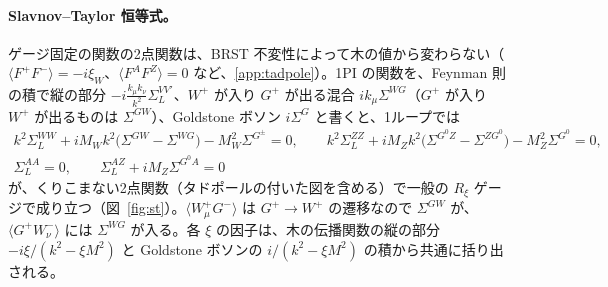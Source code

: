 \documentclass[a4paper,10pt]{ltjsarticle}
\begin{document}
\paragraph{Slavnov--Taylor 恒等式。}ゲージ固定の関数の2点関数は、BRST 不変性によって木の値から変わらない（$\langle F^+F^-\rangle=-i\xi_W$、$\langle F^AF^Z\rangle=0$ など、\ref{app:tadpole}）。1PI の関数を、Feynman 則の積で縦の部分 $-i\frac{k_\mu k_\nu}{k^2}\Sigma^{VV'}_L$、$W^+$ が入り $G^+$ が出る混合 $ik_\mu\Sigma^{WG}$（$G^+$ が入り $W^+$ が出るものは $\Sigma^{GW}$）、Goldstone ボソン $i\Sigma^{G}$ と書くと、1ループでは
\begin{equation}
\begin{gathered}
k^2\Sigma^{WW}_L+iM_Wk^2\bigl(\Sigma^{GW}-\Sigma^{WG}\bigr)-M_W^2\Sigma^{G^\pm}=0,\qquad
k^2\Sigma^{ZZ}_L+iM_Zk^2\bigl(\Sigma^{G^0Z}-\Sigma^{ZG^0}\bigr)-M_Z^2\Sigma^{G^0}=0,\\
\Sigma^{AA}_L=0,\qquad \Sigma^{AZ}_L+iM_Z\Sigma^{G^0A}=0
\end{gathered}
\label{eq:st}
\end{equation}
が、くりこまない2点関数（タドポールの付いた図を含める）で一般の $R_\xi$ ゲージで成り立つ（図~\ref{fig:st}）。$\langle W^+_\mu G^-\rangle$ は $G^+\to W^+$ の遷移なので $\Sigma^{GW}$ が、$\langle G^+W^-_\nu\rangle$ には $\Sigma^{WG}$ が入る。各 $\xi$ の因子は、木の伝播関数の縦の部分 $-i\xi/(k^2-\xi M^2)$ と Goldstone ボソンの $i/(k^2-\xi M^2)$ の積から共通に括り出される。
\end{document}
